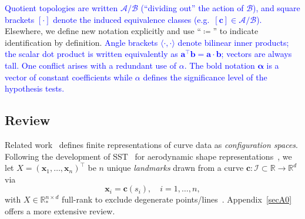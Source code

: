 \documentclass[pdflatex,iicol]{sn-jnl}%
\theoremstyle{thmstyleone}%
\theoremstyle{thmstyletwo}%
\theoremstyle{thmstylethree}%
\begin{document}
\textcolor{blue}{Quotient topologies are written $\mathcal{A}/\mathcal{B}$ (``dividing out'' the action of $\mathcal{B}$), and square brackets $[\cdot]$ denote the induced equivalence classes (e.g.\ $[\boldsymbol{c}]\in\mathcal{A}/\mathcal{B}$).} Elsewhere, we define new notation explicitly and use ``$\coloneqq$'' to indicate identification by definition. \textcolor{blue}{Angle brackets $\langle\cdot,\cdot\rangle$ denote bilinear inner products; the scalar dot product is written equivalently as $\boldsymbol{a}^{\top}\boldsymbol{b}=\boldsymbol{a}\cdot\boldsymbol{b}$; vectors are always tall. One conflict arises with a redundant use of $\alpha$. The bold notation $\boldsymbol{\alpha}$ is a vector of constant coefficients while $\alpha$ defines the significance level of the hypothesis tests.}

\subsection{Review} \label{subsec:SST}
Related work~\cite{grey2023separable, bryner20142d, srivastava2016functional, kendall2009shape} defines finite representations of curve data as \textit{configuration spaces}. Following the development of SST~\cite{grey2023separable} for aerodynamic shape representations~\cite{doronina2022grassmannian}, we let $X = (\boldsymbol{x}_1,\dots,\boldsymbol{x}_n)^{\top}$ be $n$ unique \emph{landmarks} drawn from a curve $\boldsymbol{c}:\mathcal{I} \subset \mathbb{R} \rightarrow \mathbb{R}^d$ via
\begin{equation}\label{eq:data}
    \boldsymbol{x}_i = \boldsymbol{c}(s_i), \quad i=1,\dots,n,
\end{equation}
with $X\in\mathbb{R}^{n\times d}_*$ full-rank to exclude degenerate points/lines~\cite{absil2008optimization, grey2023separable}. Appendix~\ref{secA0} offers a more extensive review.
\end{document}
